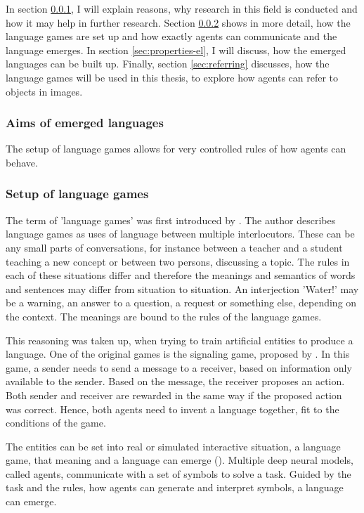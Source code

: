 In section \ref{sec:aims_languages}, I will explain reasons, why research in this field is conducted and how it may help in further research.
Section \ref{sec:setup-lg} shows in more detail, how the language games are set up and how exactly agents can communicate and the language emerges.
In section \ref{sec:properties-el}, I will discuss, how the emerged languages can be built up.
Finally, section \ref{sec:referring} discusses, how the language games will be used in this thesis, to explore how agents can refer to objects in images.

\subsubsection{Aims of emerged languages}
\label{sec:aims_languages}
The setup of language games allows for very controlled rules of how agents can behave.


\subsubsection{Setup of language games}
\label{sec:setup-lg}
The term of 'language games' was first introduced by \citet{Wittgenstein1953}.
The author describes language games as uses of language between multiple interlocutors.
These can be any small parts of conversations, for instance between a teacher and a student teaching a new concept or between two persons, discussing a topic.
The rules in each of these situations differ and therefore the meanings and semantics of words and sentences may differ from situation to situation.
An interjection 'Water!' may be a warning, an answer to a question, a request or something else, depending on the context.
The meanings are bound to the rules of the language games.

This reasoning was taken up, when trying to train artificial entities to produce a language.
One of the original games is the signaling game, proposed by \citet{Lewis1969}.
In this game, a sender needs to send a message to a receiver, based on information only available to the sender.
Based on the message, the receiver proposes an action.
Both sender and receiver are rewarded in the same way if the proposed action was correct.
Hence, both agents need to invent a language together, fit to the conditions of the game.

The entities can be set into real or simulated interactive situation, a language game, that meaning and a language can emerge (\citet{Kirby2002}).
Multiple deep neural models, called agents, communicate with a set of symbols to solve a task.
Guided by the task and the rules, how agents can generate and interpret symbols, a language can emerge.

